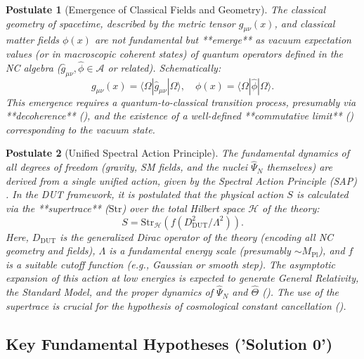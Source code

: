 \documentclass[11pt, a4paper]{article}
\newtheorem{postulate}{Postulate}
\theoremstyle{remark}
\newcommand{\Op}[1]{\hat{#1}}
\newcommand{\Str}{\mathrm{Str}}
\newcommand{\Mpl}{M_{\mathrm{Pl}}}
\begin{document}
\begin{postulate}[Emergence of Classical Fields and Geometry]
    \label{post:emergence_final}
    The classical geometry of spacetime, described by the metric tensor \( g_{\mu\nu}(x) \), and classical matter fields \( \phi(x) \) are not fundamental but **emerge** as vacuum expectation values (or in macroscopic coherent states) of quantum operators defined in the NC algebra (\( \hat{g}_{\mu\nu}, \hat{\phi} \in \mathcal{A} \) or related). Schematically:
    \[ g_{\mu\nu}(x) = \langle\Omega| \hat{g}_{\mu\nu} |\Omega\rangle, \quad \phi(x) = \langle\Omega| \hat{\phi} |\Omega\rangle. \]
    This emergence requires a quantum-to-classical transition process, presumably via **decoherence** (), and the existence of a well-defined **commutative limit** () corresponding to the vacuum state.
\end{postulate}

\begin{postulate}[Unified Spectral Action Principle]
    \label{post:action_final}
    The fundamental dynamics of all degrees of freedom (gravity, SM fields, and the nuclei \( \Op{\Psi}_N \) themselves) are derived from a single unified action, given by the Spectral Action Principle (SAP) \citep{ConnesChamseddine1997}. In the DUT framework, it is postulated that the physical action \( S \) is calculated via the **supertrace** (\( \Str \)) over the total Hilbert space \( \mathcal{H} \) of the theory:
    \begin{equation} \label{eq:accion_espectral_raw_final}
    S = \Str_{\mathcal{H}}(f(D_{\text{DUT}}^2/\Lambda^2)).
    \end{equation}
    Here, \( D_{\text{DUT}} \) is the generalized Dirac operator of the theory (encoding all NC geometry and fields), \( \Lambda \) is a fundamental energy scale (presumably \( \sim \Mpl \)), and \( f \) is a suitable cutoff function (e.g., Gaussian or smooth step). The asymptotic expansion of this action at low energies \citep{Vassilevich2003HeatKernel} is expected to generate General Relativity, the Standard Model, and the proper dynamics of \( \Op{\Psi}_N \) and \( \Op{\Theta} \) (). The use of the supertrace is crucial for the hypothesis of cosmological constant cancellation ().
\end{postulate}

\subsection{Key Fundamental Hypotheses ('Solution 0')}
\label{subsec:key_hypotheses_final}
\end{document}
